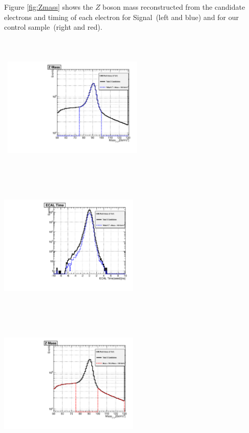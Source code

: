 \begin{center}
\label{fig:Elec}
\end{center}

Figure \ref{fig:Zmass} shows the $Z$ boson mass reconstructed from the candidate electrons and timing of each electron for Signal~(left and blue) and for our control sample~(right and red).

\begin{center}
\centering
\mbox{
\includegraphics[height=7cm, width=0.5\textwidth]{THESISPLOTS/Z-CandidateOverLay-SignalMass.pdf}
\includegraphics[height=7cm, width=0.5\textwidth]{THESISPLOTS/Z-CandidateOverLay-SignalTime.pdf}}
\mbox{
\includegraphics[height=7cm, width=0.5\textwidth]{THESISPLOTS/Z-CandidateOverLay-BackgroundMass.pdf}
}
\end{center}
